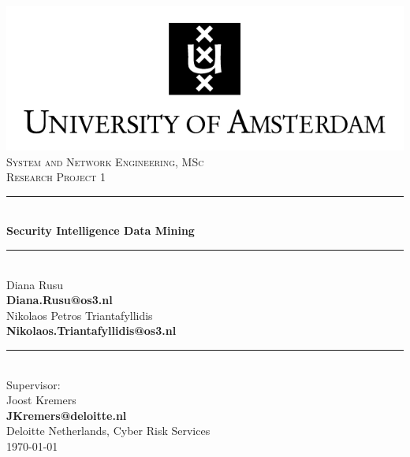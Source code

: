\documentclass[12pt]{article}
\begin{document}
\begin{titlepage}

\newcommand{\HRule}{\rule{\linewidth}{0.5mm}} 
\center


\includegraphics{images/uva.jpeg}\\[0.5cm]%
 

\textsc{\Large System and Network Engineering, MSc}\\[0.5cm] 
\textsc { \large Research Project 1}\\[0.4cm] %

\HRule \\[0.4cm]
{ \huge \bfseries Security Intelligence Data Mining}\\[0.4cm] %
\HRule \\[0.4cm]




\large Diana Rusu\\
{\bfseries Diana.Rusu@os3.nl}\\[0.5cm]
\large Nikolaos Petros Triantafyllidis\\
{\bfseries Nikolaos.Triantafyllidis@os3.nl}\\[1cm]
\rule{10cm} {0.4pt}\\
Supervisor:\\[0.2cm]
\large Joost Kremers\\
{\bfseries  JKremers@deloitte.nl}\\
\large Deloitte Netherlands, Cyber Risk Services\\[2cm]


{\large \today} 

\end{titlepage}
\end{document}
